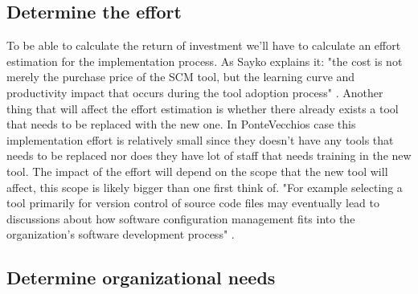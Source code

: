 \documentclass[10pt]{article}
\begin{document}
\subsection{Determine the effort}
To be able to calculate the return of investment we'll have to calculate an effort estimation for the implementation process. As Sayko \cite{Sayko} explains it: "the cost is not merely the purchase price of the SCM tool, but the learning curve and productivity impact that occurs during the tool adoption process" \cite{Sayko}. Another thing that will affect the effort estimation is whether there already exists a tool that needs to be replaced with the new one. In PonteVecchios case this implementation effort is relatively small since they doesn't have any tools that needs to be replaced nor does they have lot of staff that needs training in the new tool. The impact of the effort will depend on the scope that the new tool will affect, this scope is likely bigger than one first think of. "For example selecting a tool primarily for version control of source code files may eventually lead to discussions about how software configuration management fits into the organization's software development process" \cite{Sayko}.

\subsection{Determine organizational needs}
\end{document}
